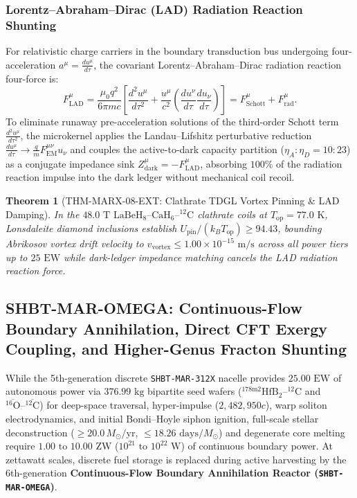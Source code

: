 \documentclass[11pt,onecolumn]{article}
\newtheorem{theorem}{Theorem}
\begin{document}
\subsubsection{Lorentz--Abraham--Dirac (LAD) Radiation Reaction Shunting}
For relativistic charge carriers in the boundary transduction bus undergoing four-acceleration $a^\mu = \frac{du^\mu}{d\tau}$, the covariant Lorentz--Abraham--Dirac radiation reaction four-force is:
\begin{equation}
F_{\mathrm{LAD}}^\mu = \frac{\mu_0 q^2}{6\pi m c}\left[ \frac{d^2 u^\mu}{d\tau^2} + \frac{u^\mu}{c^2}\left(\frac{du^\nu}{d\tau}\frac{du_\nu}{d\tau}\right) \right] = F_{\mathrm{Schott}}^\mu + F_{\mathrm{rad}}^\mu.
\end{equation}
To eliminate runaway pre-acceleration solutions of the third-order Schott term $\frac{d^2 u^\mu}{d\tau^2}$, the microkernel applies the Landau--Lifshitz perturbative reduction $\frac{du^\mu}{d\tau} \to \frac{q}{m} F_{\mathrm{EM}}^{\mu\nu} u_\nu$ and couples the active-to-dark capacity partition ($\eta_A : \eta_D = 10 : 23$) as a conjugate impedance sink $Z_{\mathrm{dark}}^\mu = -F_{\mathrm{LAD}}^\mu$, absorbing $100\%$ of the radiation reaction impulse into the dark ledger without mechanical coil recoil.

\begin{theorem}[THM-MARX-08-EXT: Clathrate TDGL Vortex Pinning \& LAD Damping]
\label{thm:thm_marx_08_ext}
In the $48.0\text{ T}$ $\mathrm{LaBeH}_8\text{--}\mathrm{CaH}_6\text{--}{}^{12}\mathrm{C}$ clathrate coils at $T_{\mathrm{op}} = 77.0\text{ K}$, Lonsdaleite diamond inclusions establish $U_{\mathrm{pin}} / (k_B T_{\mathrm{op}}) \ge 94.43$, bounding Abrikosov vortex drift velocity to $v_{\mathrm{vortex}} \le 1.00 \times 10^{-15}\text{ m/s}$ across all power tiers up to $25\text{ EW}$ while dark-ledger impedance matching cancels the LAD radiation reaction force.
\end{theorem}

\subsection{SHBT-MAR-OMEGA: Continuous-Flow Boundary Annihilation, Direct CFT Exergy Coupling, and Higher-Genus Fracton Shunting}
\label{sec:mar_omega_reactor}

While the 5th-generation discrete \texttt{SHBT-MAR-312X} nacelle provides $25.00\text{ EW}$ of autonomous power via $376.99\text{ kg}$ bipartite seed wafers ($^{178\text{m2}}\text{Hf}\text{B}_2\text{--}^{12}\text{C}$ and $\overline{^{16}\text{O}}\text{--}\overline{^{12}\text{C}}$) for deep-space traversal, hyper-impulse ($2{,}482{,}950c$), warp soliton electrodynamics, and initial Bondi--Hoyle siphon ignition, full-scale stellar deconstruction ($\ge 20.0\,M_\odot/\text{yr}$, $\le 18.26\text{ days}/M_\odot$) and degenerate core melting require $1.00\text{ to }10.00\text{ ZW}$ ($10^{21}\text{ to }10^{22}\text{ W}$) of continuous boundary power. At zettawatt scales, discrete fuel storage is replaced during active harvesting by the 6th-generation \textbf{Continuous-Flow Boundary Annihilation Reactor (\texttt{SHBT-MAR-OMEGA})}.
\end{document}

